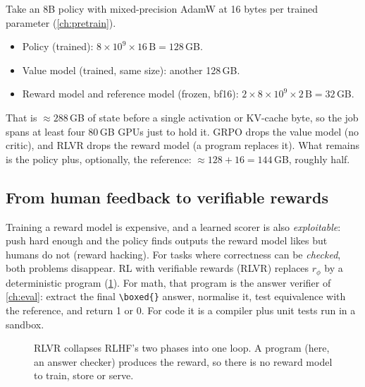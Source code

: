 \begin{napkinmath}
Take an 8B policy with mixed-precision AdamW at 16 bytes per trained parameter
(\cref{ch:pretrain}).
\begin{itemize}
\item Policy (trained): $8\times10^9\times16\,\text{B}=128$\,GB.
\item Value model (trained, same size): another 128\,GB.
\item Reward model and reference model (frozen, bf16): $2\times 8\times10^9\times2\,\text{B}=32$\,GB.
\end{itemize}
That is $\approx288$\,GB of state before a single activation or KV-cache byte, so the job
spans at least four 80\,GB GPUs just to hold it. GRPO drops the value model (no critic),
and RLVR drops the reward model (a program replaces it). What remains is the policy
plus, optionally, the reference: $\approx128+16=144$\,GB, roughly half.
\end{napkinmath}

\subsection{From human feedback to verifiable rewards}\label{sec:grpo:rlvr}

Training a reward model is expensive, and a learned scorer is also \emph{exploitable}:
push hard enough and the policy finds outputs the reward model likes but humans do not
(reward hacking). For tasks where correctness can be \emph{checked}, both problems
disappear. RL with verifiable rewards (RLVR) replaces $r_\phi$ by a deterministic program
(\cref{fig:grpo:rlvr}). For math, that program is the answer verifier of \cref{ch:eval}:
extract the final \verb|\boxed{}| answer, normalise it, test equivalence with the reference,
and return 1 or 0. For code it is a compiler plus unit tests run in a sandbox.

\begin{figure}[ht]
\centering
{}
\caption{RLVR collapses RLHF's two phases into one loop. A program (here, an answer
checker) produces the reward, so there is no reward model to train, store or serve.}
\label{fig:grpo:rlvr}
\end{figure}

